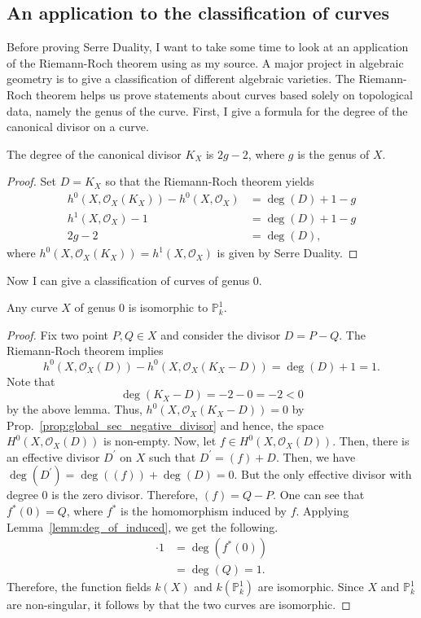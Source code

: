 \subsection{An application to the classification of curves}
Before proving Serre Duality, I want to take some time to
look at an application of the Riemann-Roch theorem using \cite{hartshorne}
as my source. A major project in algebraic geometry is to give a
classification of different algebraic varieties. The Riemann-Roch theorem
helps us prove statements about curves based solely on topological data,
namely the genus of the curve. First, I give a formula for the degree
of the canonical divisor on a curve.
\begin{lemm}
  The degree of the canonical divisor $K_{X}$ is $2g-2$, where $g$ is the
  genus of $X$.
\end{lemm}
\begin{proof}
  Set $D=K_{X}$ so that the Riemann-Roch theorem yields
  \begin{align*}
    h^{0}(X,\mathscr{O}_X(K_{X}))-h^{0}(X,\mathscr{O}_{X})&=\deg(D)+1-g \\
    h^{1}(X,\mathscr{O}_{X})-1&=\deg(D)+1-g \\
    2g-2&=\deg(D),
  \end{align*}
  where $h^{0}(X,\mathscr{O}_X(K_{X}))=h^{1}(X,\mathscr{O}_{X})$ is given
  by Serre Duality.
\end{proof}
Now I can give a classification of curves of genus 0.
\begin{thm}
  Any curve $X$ of genus 0 is isomorphic to $\mathbb{P}^{1}_{k}$.
\end{thm}
\begin{proof}
  Fix two point $P,Q\in X$ and consider the divisor $D=P-Q$. The Riemann-Roch
  theorem implies
  \[
    h^{0}(X,\mathscr{O}_X(D))-h^{0}(X,\mathscr{O}_X(K_{X}-D))
    =\deg(D)+1=1.
  \]
  Note that
  \[\deg(K_{X}-D)=-2-0=-2<0\]
  by the above lemma. Thus, $h^{0}(X,\mathscr{O}_X(K_{X}-D))=0$
  by Prop.~\ref{prop:global_sec_negative_divisor} and hence, the space
  $H^{0}(X,\mathscr{O}_X(D))$ is non-empty. Now, let
  $f\in H^{0}(X,\mathscr{O}_X(D))$. Then, there is an effective divisor
  $D^{\prime}$ on $X$ such that $D^{\prime}=(f)+D$. Then, we have
  $\deg\left(D^{\prime}\right)=\deg\left((f)\right)+\deg\left(D\right)=0$.
  But the only effective divisor with degree 0 is the zero divisor.
  Therefore, $(f)=Q-P$. One can see that $f^{\ast}(0)=Q$, where
  $f^{\ast}$ is the homomorphism induced by $f$. Applying
  Lemma~\ref{lemm:deg_of_induced}, we get the following.
  \begin{align*}
    [k(X):k(\mathbb{P}^{1})]\cdot 1
    &=\deg\left(f^{\ast}(0)\right) \\
    &=\deg(Q) = 1.
  \end{align*}
  Therefore, the function fields $k(X)$ and $k\left(\mathbb{P}^{1}_{k}\right)$
  are isomorphic. Since $X$ and $\mathbb{P}^{1}_{k}$ are non-singular,
  it follows by \cite[Proposition 6.7]{hartshorne} that the two curves
  are isomorphic.
\end{proof}
